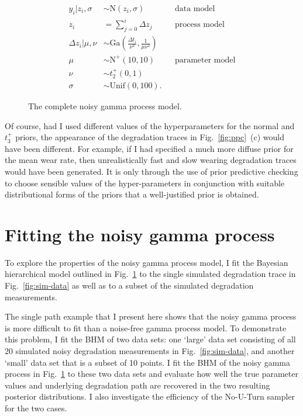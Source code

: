 \begin{figure}
  \centering
  \begin{align*}
    y_i|z_i, \sigma & \sim \mbox{N}(z_i, \sigma)  && \mbox{data model} \\
    z_i & = \sum_{j=0}^i \Delta z_j && \mbox{process model} \\ 
    \Delta z_i|\mu, \nu & \sim \mbox{Ga} \left( \frac{\Delta t_i}{\nu^2}, \frac{1}{\mu \nu^2} \right) \\
    \mu & \sim \mbox{N}^{+}(10, 10) && \mbox{parameter model} \\
    \nu & \sim t_2^{+}(0, 1) \\
    \sigma & \sim \mbox{Unif}(0, 100).
  \end{align*}
  \caption{The complete noisy gamma process model.}
  \label{fig:ngp-full-model}
\end{figure}

Of course, had I used different values of the hyperparameters for the normal and $t_3^{+}$ priors, the appearance of the degradation traces in Fig.~\ref{fig:ppc}~(c) would have been different. For example, if I had specified a much more diffuse prior for the mean wear rate, then unrealistically fast and slow wearing degradation traces would have been generated. It is only through the use of prior predictive checking to choose sensible values of the hyper-parameters in conjunction with suitable distributional forms of the priors that a well-justified prior is obtained.

\section{Fitting the noisy gamma process} \label{sec:NGP-fitting}

To explore the properties of the noisy gamma process model, I fit the Bayesian hierarchical model outlined in Fig.~\ref{fig:ngp-full-model} to the single simulated degradation trace in Fig.~\ref{fig:sim-data} as well as to a subset of the simulated degradation measurements.

The single path example that I present here shows that the noisy gamma process is more difficult to fit than a noise-free gamma process model. To demonstrate this problem, I fit the BHM of two data sets: one `large' data set consisting of all 20 simulated noisy degradation measurements in Fig.~\ref{fig:sim-data}, and another `small' data set that is a subset of 10 points. I fit the BHM of the noisy gamma process in Fig.~\ref{fig:ngp-full-model} to these two data sets and evaluate how well the true parameter values and underlying degradation path are recovered in the two resulting posterior distributions. I also investigate the efficiency of the No-U-Turn sampler for the two cases.

